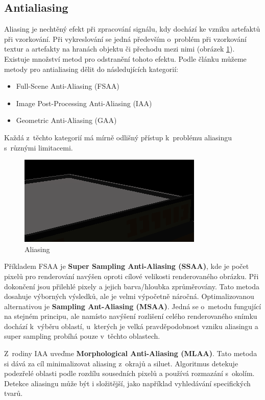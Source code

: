 \subsection{Antialiasing}
Aliasing je nechtěný efekt při zpracování signálu, kdy dochází ke vzniku artefaktů při vzorkování. Při vykreslování se jedná především o~problém při vzorkování textur a artefakty na hranách objektu či přechodu mezi nimi (obrázek \ref{fig:aliasing}). Existuje množství metod pro odstranění tohoto efektu. Podle článku \cite{aa_survey} můžeme metody pro antialiasing dělit do následujících kategorií:

\begin{itemize}
	\item Full-Scene Anti-Aliasing (FSAA)
	\item Image Post-Processing Anti-Aliasing (IAA)
	\item Geometric Anti-Aliasing (GAA)
\end{itemize}

Každá z~těchto kategorií má mírně odlišný přístup k~problému aliasingu s~různými limitacemi.

\begin{figure}[H]
	\centering
	\includegraphics[scale=2]{obrazky-figures/aliasing.png}
	\caption{Aliasing}
	\label{fig:aliasing}
\end{figure}

Příkladem FSAA je \textbf{Super Sampling Anti-Aliasing (SSAA)}, kde je počet pixelů pro renderování navýšen oproti cílové velikosti renderovaného obrázku. Při dokončení jsou přilehlé pixely a jejich barva/hloubka zprůměrovány. Tato metoda dosahuje výborných výsledků, ale je velmi výpočetně náročná. Optimalizovanou alternativou je \textbf{Sampling Ant-Aliasing (MSAA)}. Jedná se o~metodu fungující na stejném principu, ale namísto navýšení rozlišení celého renderovaného snímku dochází k~výběru oblastí, u~kterých je velká pravděpodobnost vzniku aliasingu a super sampling probíhá pouze v~těchto oblastech.

Z~rodiny IAA uveďme\textbf{ Morphological Anti-Aliasing (MLAA)}. Tato metoda si dává za cíl minimalizovat aliasing z~okrajů a siluet. Algoritmus detekuje podezřelé oblasti podle rozdílu sousedních pixelů a používá rozmazání s~okolím. Detekce aliasingu může být i složitější, jako například vyhledávání specifických tvarů.


